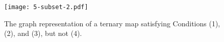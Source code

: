 \documentclass{article}
\newtheorem{lemma}{Lemma}
\begin{document}
 




\begin{figure}[ht!]
\centering  
\texttt{[image: 5-subset-2.pdf]} 
\caption{The graph representation of a ternary map satisfying Conditions (1), (2), and (3), but not (4).} 
 \label{fig:5-subset-2} 
\end{figure}
















% 
% 
% 
% 
% 
% 
% 
% 


% 
% 
\end{document}
